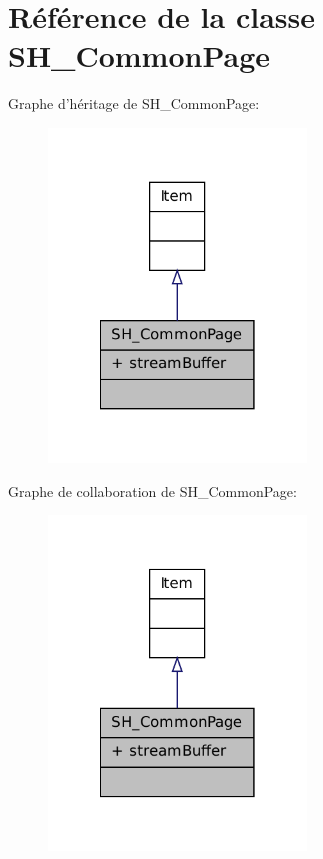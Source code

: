 \hypertarget{classSH__CommonPage}{\section{Référence de la classe S\-H\-\_\-\-Common\-Page}
\label{classSH__CommonPage}
}


Graphe d'héritage de S\-H\-\_\-\-Common\-Page\-:
\nopagebreak
\begin{figure}[H]
\begin{center}
\leavevmode
\includegraphics[width=194pt]{classSH__CommonPage__inherit__graph}
\end{center}
\end{figure}


Graphe de collaboration de S\-H\-\_\-\-Common\-Page\-:
\nopagebreak
\begin{figure}[H]
\begin{center}
\leavevmode
\includegraphics[width=194pt]{classSH__CommonPage__coll__graph}
\end{center}
\end{figure}

